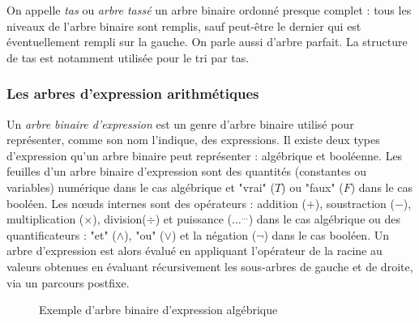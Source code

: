 \documentclass{report}
\begin{document}
On appelle \textit{tas} ou \textit{arbre tassé} un arbre binaire ordonné presque complet : tous les niveaux de l'arbre binaire sont remplis, sauf peut-être le dernier qui est éventuellement rempli sur la gauche. On parle aussi d'arbre parfait. La structure de tas est notamment utilisée pour le tri par tas. 

\subsubsection{Les arbres d'expression arithmétiques}

Un \textit{arbre binaire d'expression} est un genre d'arbre binaire utilisé pour représenter, comme son nom l'indique, des expressions. Il existe deux types d'expression qu'un arbre binaire peut représenter : algébrique et booléenne.
Les feuilles d'un arbre binaire d'expression sont des quantités (constantes ou variables) numérique dans le cas algébrique et "vrai" ($T$) ou "faux" ($F$) dans le cas booléen.
Les nœuds internes sont des opérateurs : addition ($+$), soustraction ($-$), multiplication ($\times$), division($\div$) et puissance ($\ldots^{\ldots}$) dans le cas algébrique ou des quantificateurs : "et" ($\wedge$), "ou" ($\vee$) et la négation ($\neg$) dans le cas booléen.
Un arbre d'expression est alors évalué en appliquant l'opérateur de la racine au valeurs obtenues en évaluant récursivement les sous-arbres de gauche et de droite, via un parcours postfixe. 
\begin{figure}[h]
\begin{center}
\caption{Exemple d'arbre binaire d'expression algébrique} \label{fig:Exemple d'arbre binaire d'expression algébrique}
\end{center}
\end{figure} 
\end{document}
